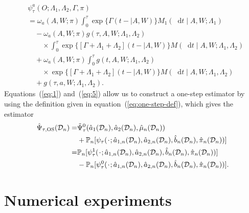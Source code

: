 \documentclass[11pt]{article}
\theoremstyle{thmstyleone}%
\theoremstyle{thmstyletwo}%
\theoremstyle{thmstylethree}%
\newcommand{\blank}{\makebox[1ex]{\textbf{$\cdot$}}}
\newcommand*\diff{\mathop{}\!\mathrm{d}}
\newcommand{\1}{\mathds{1}}
\newcommand{\empmeas}{\ensuremath{\mathbb{P}_n}} %
\newcommand{\data}{\ensuremath{\mathcal{D}}}
\begin{document}
\begin{equation}
  \label{eq:5}
  \begin{split}
    & \psi_{\tau}^a(O; \Lambda_1, \Lambda_2, \Gamma, \pi)
    \\
    & =
      \omega_a(A,W; \pi)
      \int_0^{\tau} \exp{\{{\Gamma(t- \mid A, W)}\}}   
      M_1(\diff t \mid A, W; \Lambda_1)
    \\
    & \quad
      -
      \omega_a(A,W; \pi)
      g(\tau, A, W; \Lambda_1, \Lambda_2)
    \\
    & \quad \quad \times
      \int_0^{\tau}
      \exp{\{{[\Gamma+\Lambda_1 + \Lambda_2](t- \mid A, W)}\}}
      M(\diff t \mid A, W; \Lambda_1, \Lambda_2)
    \\
    & \quad
      +
      \omega_a(A,W; \pi)      
      \int_0^{\tau}
      g(t, A, W; \Lambda_1, \Lambda_2)
    \\
    & \quad \quad \times
      \exp{\{{[\Gamma+\Lambda_1 + \Lambda_2](t- \mid A, W)}\}}
      M(\diff t \mid A, W; \Lambda_1, \Lambda_2)
    \\
    & \quad + g(\tau, a, W; \Lambda_1, \Lambda_2).
  \end{split}
\end{equation}
Equations~(\ref{eq:1}) and~(\ref{eq:5}) allow us to construct a one-step
estimator by using the definition given in equation~(\ref{eq:one-step-def}),
which gives the estimator
\begin{equation}
  \label{eq:one-step-comp-ate}
  \begin{split}
    \hat{\Psi}_{\tau,\text{OS}}(\data_n)
    = &
        \tilde{\Psi}_{\tau}^0(\hat{a}_1(\data_n), \hat{a}_2(\data_n),
        \hat{\mu}_n(\data_n))
    \\
      &
        +
        \empmeas{[\psi_{\tau}(\blank; \hat{a}_{1,n}(\data_n), \hat{a}_{2,n}(\data_n),
        \hat{b}_n(\data_n), \hat{\pi}_n(\data_n))]}
    \\
    = &
        \empmeas{[\psi_{\tau}^1(\blank; \hat{a}_{1,n}(\data_n), \hat{a}_{2,n}(\data_n),
        \hat{b}_n(\data_n), \hat{\pi}_n(\data_n))]}
    \\
      &
        - \empmeas{[\psi_{\tau}^0(\blank; \hat{a}_{1,n}(\data_n), \hat{a}_{2,n}(\data_n),
        \hat{b}_n(\data_n), \hat{\pi}_n(\data_n))]}.
  \end{split}
\end{equation}


\section{Numerical experiments}
\label{sec:numer-exper}
\end{document}
